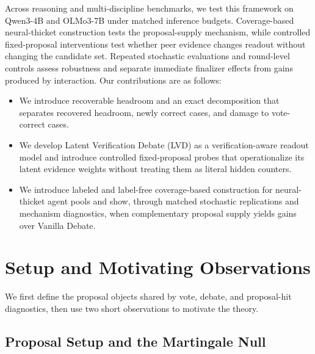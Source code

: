 \documentclass{article}
\newcommand{\readout}{Latent Verification Debate}
\begin{document}
Across reasoning and multi-discipline benchmarks, we test this framework on
Qwen3-4B and OLMo3-7B under matched inference budgets. Coverage-based
neural-thicket construction tests the proposal-supply mechanism, while
controlled fixed-proposal interventions test whether peer evidence changes
readout without changing the candidate set. Repeated stochastic evaluations
and round-level controls assess robustness and separate immediate finalizer
effects from gains produced by interaction.
Our contributions are as follows:
\begin{itemize}[nosep]
\item We introduce recoverable headroom and an exact decomposition that
separates recovered headroom, newly correct cases, and damage to vote-correct
cases.
\item We develop \readout{} (LVD) as a verification-aware readout model and
introduce controlled fixed-proposal probes that operationalize its latent
evidence weights without treating them as literal hidden counters.
\item We introduce labeled and label-free coverage-based construction for
neural-thicket agent pools and show, through matched stochastic replications
and mechanism diagnostics, when complementary proposal supply yields gains over
Vanilla Debate.
\end{itemize}

\section{Setup and Motivating Observations}
\label{sec:setup_motivation}
\label{sec:setup}

We first define the proposal objects shared by vote, debate, and proposal-hit
diagnostics, then use two short observations to motivate the theory.

\subsection{Proposal Setup and the Martingale Null}
\label{subsec:martingale_null}
\label{subsec:dcm_accounting}
\end{document}
